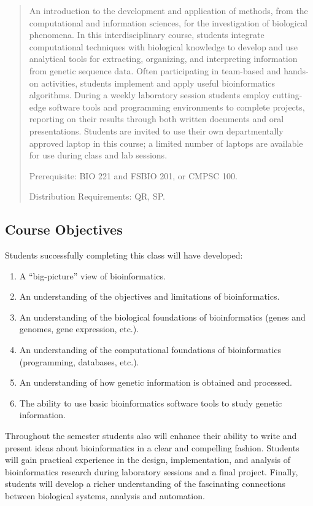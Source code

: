 \documentclass[11pt]{article} %
\begin{document}
\begin{quote}

An introduction to the development and application of methods, from the computational and information sciences, for the investigation of biological phenomena. In this interdisciplinary course, students integrate computational techniques with biological knowledge to develop and use analytical tools for extracting, organizing, and interpreting information from genetic sequence data. Often participating in team-based and hands-on activities, students implement and apply useful bioinformatics algorithms. During a weekly laboratory session students employ cutting-edge software tools and programming environments to complete projects, reporting on their results through both written documents and oral presentations. Students are invited to use their own departmentally approved laptop in this course; a limited number of laptops are available for use during class and lab sessions.

Prerequisite: BIO 221 and FSBIO 201, or CMPSC 100.

Distribution Requirements: QR, SP.
\end{quote}




\subsection*{\textbf{Course Objectives}}

Students successfully completing this class will have developed:
\begin{enumerate}
  \item A “big-picture” view of bioinformatics.
  \item An understanding of the objectives and limitations of bioinformatics.
  \item An understanding of the biological foundations of bioinformatics (genes and genomes, gene expression, etc.).
  \item An understanding of the computational foundations of bioinformatics (programming, databases, etc.).
  \item An understanding of how genetic information is obtained and processed.
  \item The ability to use basic bioinformatics software tools to study genetic information.
\end{enumerate}

\noindent Throughout the semester students also will enhance their ability to write and present ideas about bioinformatics in a clear and compelling fashion. Students will gain practical experience in the design, implementation, and analysis of bioinformatics research during laboratory sessions and a final project. Finally, students will develop a richer understanding of the fascinating connections between biological systems, analysis and automation.
\end{document}
